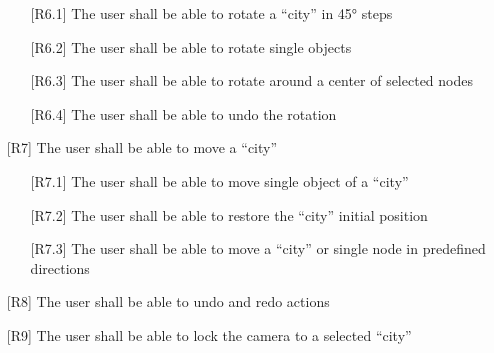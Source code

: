 \begin{itemize}
    \begin{itemize}
        \item[{[R6.1]}] The user shall be able to rotate a \enquote{\gls{city}} in 45° steps
        \item[{[R6.2]}] The user shall be able to rotate single objects
        \item[{[R6.3]}] The user shall be able to rotate around a center of selected nodes
        \item[{[R6.4]}] The user shall be able to undo the rotation
    \end{itemize}
    \item[{[R7]}] The user shall be able to move a \enquote{\gls{city}}
    \begin{itemize}
        \item[{[R7.1]}] The user shall be able to move single object of a \enquote{\gls{city}}
        \item[{[R7.2]}] The user shall be able to restore the \enquote{\gls{city}} initial position
        \item[{[R7.3]}] The user shall be able to move a \enquote{\gls{city}} or single node in predefined directions
    \end{itemize}
    \item[{[R8]}] The user shall be able to undo and redo actions
    \item[{[R9]}] The user shall be able to lock the camera to a selected \enquote{\gls{city}}
\end{itemize}